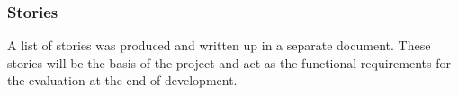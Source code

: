 \subsubsection{Stories}
A list of stories was produced and written up in a separate document. These stories will be the basis of the project and act as the functional requirements for the evaluation at the end of development.
\newpage